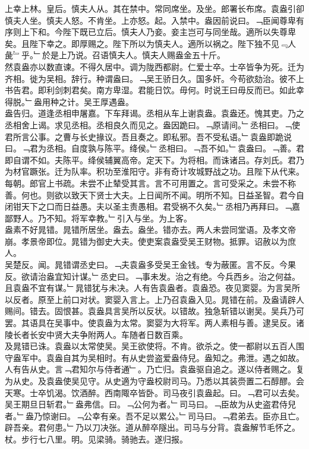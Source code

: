 \documentclass{zhvt-classic}
\begin{document}
\hspace*{2em}上幸上林。皇后。慎夫人从。其在禁中。常同席坐。及坐。郎署长布席。袁盎引卻慎夫人坐。慎夫人怒。不肯坐。上亦怒。起。入禁中。盎因前说曰。﹁臣闻尊卑有序则上下和。今陛下既已立后。慎夫人乃妾。妾主岂可与同坐哉。適所以失尊卑矣。且陛下幸之。即厚赐之。陛下所以为慎夫人。適所以祸之。陛下独不见﹃人彘﹄乎。﹂於是上乃说。召语慎夫人。慎夫人赐盎金五十斤。\\
\hspace*{2em}然袁盎亦以数直谏。不得久居中。调为陇西都尉。仁爱士卒。士卒皆争为死。迁为齐相。徙为吴相。辞行。种谓盎曰。﹁吴王骄日久。国多奸。今苟欲劾治。彼不上书告君。即利剑刺君矣。南方卑湿。君能日饮。毋何。时说王曰毋反而已。如此幸得脱。﹂盎用种之计。吴王厚遇盎。\\
\hspace*{2em}盎告归。道逢丞相申屠嘉。下车拜谒。丞相从车上谢袁盎。袁盎还。愧其吏。乃之丞相舍上谒。求见丞相。丞相良久而见之。盎因跪曰。﹁原请间。﹂丞相曰。﹁使君所言公事。之曹与长史掾议。吾且奏之。即私邪。吾不受私语。﹂袁盎即跪说曰。﹁君为丞相。自度孰与陈平。绛侯。﹂丞相曰。﹁吾不如。﹂袁盎曰。﹁善。君即自谓不如。夫陈平。绛侯辅翼高帝。定天下。为将相。而诛诸吕。存刘氏。君乃为材官蹶张。迁为队率。积功至淮阳守。非有奇计攻城野战之功。且陛下从代来。每朝。郎官上书疏。未尝不止辇受其言。言不可用置之。言可受采之。未尝不称善。何也。则欲以致天下贤士大夫。上日闻所不闻。明所不知。日益圣智。君今自闭钳天下之口而日益愚。夫以圣主责愚相。君受祸不久矣。﹂丞相乃再拜曰。﹁嘉鄙野人。乃不知。将军幸教。﹂引入与坐。为上客。\\
\hspace*{2em}盎素不好晁错。晁错所居坐。盎去。盎坐。错亦去。两人未尝同堂语。及孝文帝崩。孝景帝即位。晁错为御史大夫。使吏案袁盎受吴王财物。抵罪。诏赦以为庶人。\\
\hspace*{2em}吴楚反。闻。晁错谓丞史曰。﹁夫袁盎多受吴王金钱。专为蔽匿。言不反。今果反。欲请治盎宜知计谋。﹂丞史曰。﹁事未发。治之有绝。今兵西乡。治之何益。且袁盎不宜有谋。﹂晁错犹与未决。人有告袁盎者。袁盎恐。夜见窦婴。为言吴所以反者。原至上前口对状。窦婴入言上。上乃召袁盎入见。晁错在前。及盎请辟人赐间。错去。固恨甚。袁盎具言吴所以反状。以错故。独急斩错以谢吴。吴兵乃可罢。其语具在吴事中。使袁盎为太常。窦婴为大将军。两人素相与善。逮吴反。诸陵长者长安中贤大夫争附两人。车随者日数百乘。\\
\hspace*{2em}及晁错已诛。袁盎以太常使吴。吴王欲使将。不肯。欲杀之。使一都尉以五百人围守盎军中。袁盎自其为吴相时。有从史尝盗爱盎侍兒。盎知之。弗泄。遇之如故。人有告从史。言﹁君知尔与侍者通﹂。乃亡归。袁盎驱自追之。遂以侍者赐之。复为从史。及袁盎使吴见守。从史適为守盎校尉司马。乃悉以其装赍置二石醇醪。会天寒。士卒饥渴。饮酒醉。西南陬卒皆卧。司马夜引袁盎起。曰。﹁君可以去矣。吴王期旦日斩君。﹂盎弗信。曰。﹁公何为者。﹂司马曰。﹁臣故为从史盗君侍兒者。﹂盎乃惊谢曰。﹁公幸有亲。吾不足以累公。﹂司马曰。﹁君弟去。臣亦且亡。辟吾亲。君何患。﹂乃以刀决张。道从醉卒隧出。司马与分背。袁盎解节毛怀之。杖。步行七八里。明。见梁骑。骑驰去。遂归报。\\
\end{document}
